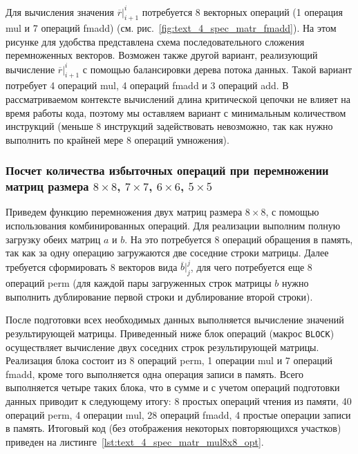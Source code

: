 Для вычисления значения $\overline{r}|_{i + 1}^i$ потребуется 8 векторных операций (1 операция mul и 7 операций fmadd) (см. рис.~\ref{fig:text_4_spec_matr_fmadd}).
На этом рисунке для удобства представлена схема последовательного сложения перемноженных векторов. Возможен также другой вариант, реализующий вычисление $\overline{r}|_{i + 1}^i$ с помощью балансировки дерева потока данных.
Такой вариант потребует 4 операций mul, 4 операций fmadd и 3 операций add.
В рассматриваемом контексте вычислений длина критической цепочки не влияет на время работы кода, поэтому мы оставляем вариант с минимальным количеством инструкций (меньше 8 инструкций задействовать невозможно, так как нужно выполнить по крайней мере 8 операций умножения).

\subsubsection{Посчет количества избыточных операций при перемножении матриц размера $8 \times 8$, $7 \times 7$, $6 \times 6$, $5 \times 5$}

Приведем функцию перемножения двух матриц размера $8 \times 8$, с помощью использования комбинированных операций.
Для реализации выполним полную загрузку обеих матриц $a$ и $b$.
На это потребуется 8 операций обращения в память, так как за одну операцию загружаются две соседние строки матрицы.
Далее требуется сформировать 8 векторов вида $\overline{b}|_j^j$, для чего потребуется еще 8 операций perm (для каждой пары загруженных строк матрицы $b$ нужно выполнить дублирование первой строки и дублирование второй строки).

После подготовки всех необходимых данных выполняется вычисление значений результирующей матрицы.
Приведенный ниже блок операций (макрос \texttt{BLOCK}) осуществляет вычисление двух соседних строк результирующей матрицы.
Реализация блока состоит из 8 операций perm, 1 операции mul и 7 операций fmadd, кроме того выполняется одна операция записи в память.
Всего выполняется четыре таких блока, что в сумме и с учетом операций подготовки данных приводит к следующему итогу: 8 простых операций чтения из памяти, 40 операций perm, 4 операции mul, 28 операций fmadd, 4 простые операции записи в память.
Итоговый код (без отображения некоторых повторяющихся участков) приведен на листинге~\ref{lst:text_4_spec_matr_mul8x8_opt}.

